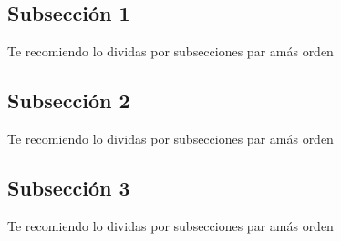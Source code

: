


    

\subsection{Subsección 1}
Te recomiendo lo dividas por subsecciones par amás orden
\subsection{Subsección 2}
Te recomiendo lo dividas por subsecciones par amás orden
\subsection{Subsección 3}
Te recomiendo lo dividas por subsecciones par amás orden

